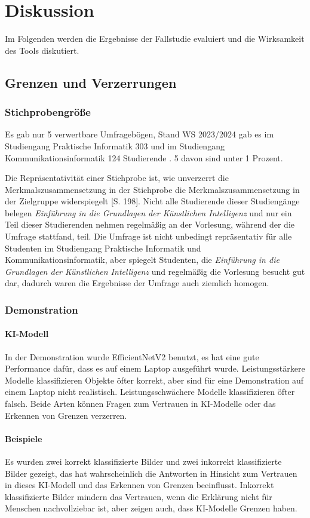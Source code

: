\chapter{Diskussion}
\label{chap:chapter-7}

Im Folgenden werden die Ergebnisse der Fallstudie evaluiert und die Wirksamkeit des Tools diskutiert.

\section{Grenzen und Verzerrungen}
\subsection{Stichprobengröße}
Es gab nur 5 verwertbare Umfragebögen, Stand WS 2023/2024 gab es im Studiengang Praktische Informatik 303 und im Studiengang Kommunikationsinformatik 124 Studierende \cite{htwStudents}. 5 davon sind unter 1 Prozent.

Die Repräsentativität einer Stichprobe ist, wie unverzerrt die Merkmalszusammensetzung in der Stichprobe die Merkmalszusammensetzung in der Zielgruppe widerspiegelt \cite{Döring2023}[S. 198]. Nicht alle Studierende dieser Studiengänge belegen \textit{Einführung in die Grundlagen der Künstlichen Intelligenz} und nur ein Teil dieser Studierenden nehmen regelmäßig an der Vorlesung, während der die Umfrage stattfand, teil.
Die Umfrage ist nicht unbedingt repräsentativ für alle Studenten im Studiengang Praktische Informatik und Kommunikationsinformatik, aber spiegelt Studenten, die \textit{Einführung in die Grundlagen der Künstlichen Intelligenz} und regelmäßig die Vorlesung besucht gut dar, dadurch waren die Ergebnisse der Umfrage auch ziemlich homogen.
\subsection{Demonstration}
\subsubsection{KI-Modell}
In der Demonstration wurde EfficientNetV2 benutzt, es hat eine gute Performance dafür, dass es auf einem Laptop ausgeführt wurde. Leistungsstärkere Modelle klassifizieren Objekte öfter korrekt, aber sind für eine Demonstration auf einem Laptop nicht realistisch. Leistungsschwächere Modelle klassifizieren öfter falsch. Beide Arten können Fragen zum Vertrauen in KI-Modelle oder das Erkennen von Grenzen verzerren.
\subsubsection{Beispiele}
Es wurden zwei korrekt klassifizierte Bilder und zwei inkorrekt klassifizierte Bilder gezeigt, das hat wahrscheinlich die Antworten in Hinsicht zum Vertrauen in dieses KI-Modell und das Erkennen von Grenzen beeinflusst. Inkorrekt klassifizierte Bilder mindern das Vertrauen, wenn die Erklärung nicht für Menschen nachvollziebar ist, aber zeigen auch, dass KI-Modelle Grenzen haben. 



